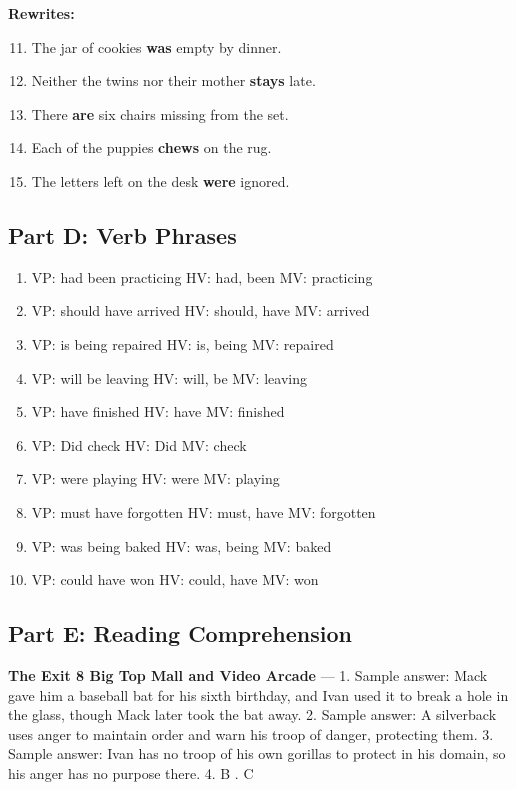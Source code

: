 \documentclass[11pt]{article}
\begin{document}
\vspace{4pt}
\noindent\textbf{Rewrites:}
\begin{enumerate}\setcounter{enumi}{10}
  \item The jar of cookies \textbf{was} empty by dinner.
  \item Neither the twins nor their mother \textbf{stays} late.
  \item There \textbf{are} six chairs missing from the set.
  \item Each of the puppies \textbf{chews} on the rug.
  \item The letters left on the desk \textbf{were} ignored.
\end{enumerate}

\subsection*{Part D: Verb Phrases}
\begin{enumerate}
  \item VP: had been practicing \quad HV: had, been \quad MV: practicing
  \item VP: should have arrived \quad HV: should, have \quad MV: arrived
  \item VP: is being repaired \quad HV: is, being \quad MV: repaired
  \item VP: will be leaving \quad HV: will, be \quad MV: leaving
  \item VP: have finished \quad HV: have \quad MV: finished
  \item VP: Did check \quad HV: Did \quad MV: check
  \item VP: were playing \quad HV: were \quad MV: playing
  \item VP: must have forgotten \quad HV: must, have \quad MV: forgotten
  \item VP: was being baked \quad HV: was, being \quad MV: baked
  \item VP: could have won \quad HV: could, have \quad MV: won
\end{enumerate}

\subsection*{Part E: Reading Comprehension}

\noindent\textbf{The Exit 8 Big Top Mall and Video Arcade} --- 1. Sample answer: Mack gave him a baseball bat for his sixth birthday, and Ivan used it to break a hole in the glass, though Mack later took the bat away. 2. Sample answer: A silverback uses anger to maintain order and warn his troop of danger, protecting them. 3. Sample answer: Ivan has no troop of his own gorillas to protect in his domain, so his anger has no purpose there. 4. B . C
\end{document}
